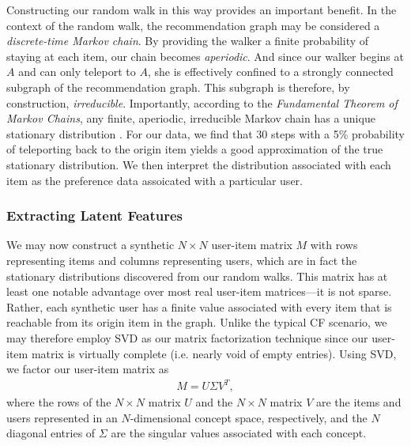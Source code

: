 \documentclass[11pt]{article}
\begin{document}
Constructing our random walk in this way provides an important benefit. In the
context of the random walk, the recommendation graph may be considered a {\em
discrete-time Markov chain}. By providing the walker a finite probability of
staying at each item, our chain becomes {\em aperiodic}. And since our walker
begins at $A$ and can only teleport to $A$, she is effectively confined to a
strongly connected subgraph of the recommendation graph. This subgraph is
therefore, by construction, {\em irreducible}.  Importantly, according to the
{\em Fundamental Theorem of Markov Chains}, any finite, aperiodic, irreducible
Markov chain has a unique stationary distribution \cite{Norris1998}. For our
data, we find that 30 steps with a 5\% probability of teleporting back to the
origin item yields a good approximation of the true stationary distribution. We
then interpret the distribution associated with each item as the preference data
assoicated with a particular user.

\subsubsection*{Extracting Latent Features}
We may now construct a synthetic $N \times N$ user-item matrix $M$ with rows
representing items and columns representing users, which are in fact the
stationary distributions discovered from our random walks. This matrix has at
least one notable advantage over most real user-item matrices---it is not
sparse.  Rather, each synthetic user has a finite value associated with every
item that is reachable from its origin item in the graph. Unlike the typical CF
scenario, we may therefore employ SVD as our matrix factorization technique
since our user-item matrix is virtually complete (i.e. nearly void of empty
entries).  Using SVD, we factor our user-item matrix as
\begin{align}
M = U \Sigma V^T,
\end{align}
where the rows of the $N \times N$ matrix $U$ and the $N \times N$ matrix $V$
are the items and users represented in an $N$-dimensional concept space,
respectively, and the $N$ diagonal entries of $\Sigma$ are the singular values
associated with each concept.
\end{document}
